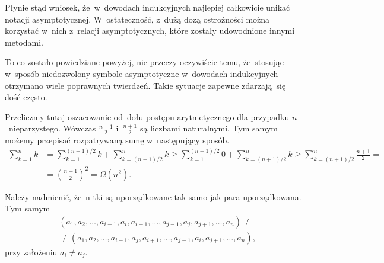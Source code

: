 \documentclass[a4paper,11pt]{article}
\begin{document}
Płynie stąd wniosek, że~w~dowodach indukcyjnych najlepiej całkowicie unikać
notacji asymptotycznej. W~ostateczność, z~dużą dozą ostrożności można
korzystać w~nich z~relacji asymptotycznych, które zostały udowodnione innymi
metodami.

To co zostało powiedziane powyżej, nie przeczy oczywiście temu, że~stosując
w~sposób niedozwolony symbole asymptotyczne w~dowodach indukcyjnych otrzymano
wiele poprawnych twierdzeń. Takie sytuacje zapewne zdarzają~się dość
często.

\vspace{\spaceFour}





\noindent
{} Przeliczmy tutaj oszacowanie od~dołu postępu arytmetycznego
dla przypadku $n$~nieparzystego. Wówczas $\frac{ n - 1 }{ 2 }$
i~$\frac{ n + 1 }{ 2 }$ są liczbami naturalnymi. Tym samym możemy przepisać
rozpatrywaną sumę w~następujący sposób.
\begin{equation}
  \label{eq:CormenAtAl-WprowadzenieDoAlgorytmow-21}
  \begin{split}
    \sum_{ k = 1 }^{ n } k &=
    \sum_{ k = 1 }^{ ( n - 1 ) / 2 } k + \sum_{ k = ( n + 1 ) / 2 }^{ n } k \geq
    \sum_{ k = 1 }^{ ( n - 1 ) / 2 } 0 + \sum_{ k = ( n + 1 ) / 2 }^{ n } k \geq
    \sum_{ k = ( n + 1 ) / 2 }^{ n } \frac{ n + 1 }{ 2 } = \\
    &= \left( \frac{ n + 1 }{ 2 } \right)^{ 2 } = \Omega( n^{ 2 } ).
  \end{split}
\end{equation}

\vspace{\spaceFour}





\noindent
{} Należy nadmienić, że~n-tki są uporządkowane tak samo jak para
uporządkowana. Tym samym
\begin{equation}
  \label{eq:CormenAtAl-WprowadzenieDoAlgorytmow-22}
  \begin{split}
    &( a_{ 1 }, a_{ 2 }, \ldots, a_{ i - 1 }, a_{ i }, a_{ i + 1 }, \ldots, a_{ j - 1 },
    a_{ j }, a_{ j + 1 }, \ldots, a_{ n } ) \neq \\
    &\neq ( a_{ 1 }, a_{ 2 }, \ldots, a_{ i - 1 }, a_{ j }, a_{ i + 1 }, \ldots,
    a_{ j - 1 }, a_{ i }, a_{ j + 1 }, \ldots, a_{ n } ),
  \end{split}
\end{equation}
przy założeniu $a_{ i } \neq a_{ j }$.
\end{document}
